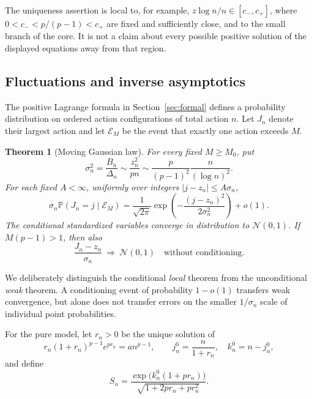 \documentclass[11pt,a4paper]{article}
\numberwithin{equation}{section}
\newtheorem{theorem}{Theorem}[section]
\theoremstyle{definition}
\theoremstyle{remark}
\newcommand{\Prob}{\mathbb P}\newcommand{\E}{\mathbb E}
\newcommand{\Normal}{\mathcal N}\newcommand{\Acal}{\mathcal A}
\newcommand{\One}{\mathcal E_M}
\begin{document}
The uniqueness assertion is local to, for example,
$z\log n/n\in[c_-,c_+]$, where
$0<c_-<p/(p-1)<c_+$ are fixed and sufficiently close, and to the
small branch of the core. It is not a claim about every possible positive
solution of the displayed equations away from that region.

\subsection{Fluctuations and inverse asymptotics}

The positive Lagrange formula in Section~\ref{sec:formal} defines a
probability distribution on ordered action configurations of total action
$n$. Let $J_n$ denote their largest action and let $\One$ be the event
that exactly one action exceeds $M$.

\begin{theorem}[Moving Gaussian law]
\label{thm:clt}
For every fixed $M\ge M_0$, put
\begin{equation}
 \sigma_n^2=\frac{B_n}{\Delta_n}
       \sim\frac{z_n^2}{pn}
       \sim\frac{p}{(p-1)^2}\frac{n}{(\log n)^2}.
 \label{eq:variance}
\end{equation}
For each fixed $A<\infty$, uniformly over integers
$|j-z_n|\le A\sigma_n$,
\begin{equation}
 \sigma_n\Prob(J_n=j\mid\One)
 =\frac1{\sqrt{2\pi}}
   \exp\!\left(-\frac{(j-z_n)^2}{2\sigma_n^2}\right)+o(1).
 \label{eq:local-clt}
\end{equation}
The conditional standardized variables converge in distribution to
$\Normal(0,1)$. If $M(p-1)>1$, then also
\begin{equation}
 \frac{J_n-z_n}{\sigma_n}\ \Longrightarrow\ \Normal(0,1)
 \quad\text{without conditioning}.
 \label{eq:clt}
\end{equation}
\end{theorem}

We deliberately distinguish the conditional \emph{local} theorem from the
unconditional \emph{weak} theorem. A conditioning event of probability
$1-o(1)$ transfers weak convergence, but alone does not transfer errors on
the smaller $1/\sigma_n$ scale of individual point probabilities.

For the pure model, let $r_n>0$ be the unique solution of
\begin{equation}
 r_n(1+r_n)^{p-1}e^{pr_n}=a n^{p-1},
 \qquad j_n^0=\frac n{1+r_n},\quad k_n^0=n-j_n^0,
 \label{eq:bare-r}
\end{equation}
and define
\begin{equation}
 S_n=\frac{\exp\!\bigl(k_n^0(1+pr_n)\bigr)}
              {\sqrt{1+2pr_n+pr_n^2}}.
 \label{eq:bare-S}
\end{equation}
\end{document}
